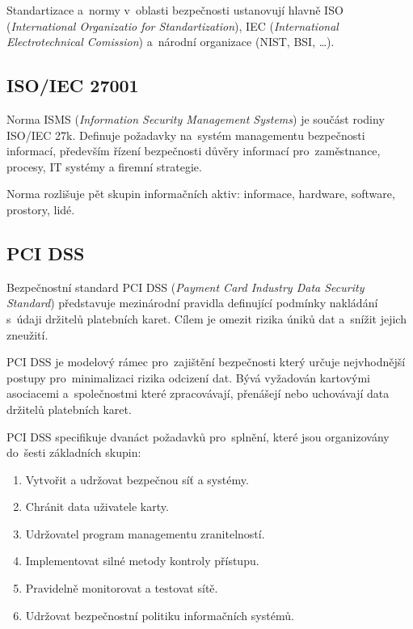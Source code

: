 Standartizace a~normy v~oblasti bezpečnosti ustanovují hlavně
ISO (\emph{International Organizatio for Standartization}),
IEC (\emph{International Electrotechnical Comission}) a~národní organizace (NIST, BSI, \dots).


\subsection{ISO/IEC 27001}

Norma ISMS (\emph{Information Security Management Systems}) je součást rodiny ISO/IEC 27k.
Definuje požadavky na~systém managementu bezpečnosti informací, především řízení bezpečnosti důvěry informací pro~zaměstnance, procesy, IT systémy a firemní strategie.

Norma rozlišuje pět skupin informačních aktiv: informace, hardware, software, prostory, lidé.


\subsection{PCI DSS}

Bezpečnostní standard PCI DSS (\emph{Payment Card Industry Data Security Standard}) představuje mezinárodní pravidla definující podmínky nakládání s~údaji držitelů platebních karet.
Cílem je omezit rizika úniků dat a~snížit jejich zneužití.

PCI DSS je modelový rámec pro~zajištění bezpečnosti který určuje nejvhodnější postupy pro~minimalizaci rizika odcizení dat.
Bývá vyžadován kartovými asociacemi a~společnostmi které zpracovávají, přenášejí nebo uchovávají data držitelů platebních karet.

PCI DSS specifikuje dvanáct požadavků pro~splnění, které jsou organizovány do~šesti základních skupin:
\vspace*{-0.5em}\begin{enumerate}
\item Vytvořit a udržovat bezpečnou síť a systémy.
\item Chránit data uživatele karty.
\item Udržovatel program managementu zranitelností.
\item Implementovat silné metody kontroly přístupu.
\item Pravidelně monitorovat a testovat sítě.
\item Udržovat bezpečnostní politiku informačních systémů.
\end{enumerate}

